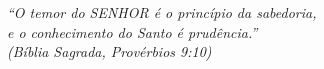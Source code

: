 \begin{epigrafe}
    \vspace*{\fill}
	\begin{flushright}

		\textit{``O temor do SENHOR é o princípio da sabedoria, \\
		e o conhecimento do Santo é prudência.''\\
		(Bíblia Sagrada, Provérbios 9:10)}
	\end{flushright}
\end{epigrafe}
